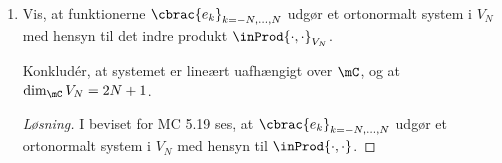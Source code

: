 \begin{opg}[Vektorrumstruktur]
\begin{enumerate}
    \iffalse\begin{proof}[Løsning]\hfill
    \begin{enumerate}[label=\roman*)]
        \item Lad $\alpha,\beta\in\mC$ og $f,g\in V_N$. Da haves
        \begin{align*}
            \inProd{\alpha f+\beta g,g_0}
                &= \frac{1}{2\pi}\int_{-\pi}^\pi
                    \pare{\alpha f\pare{x} + \beta g\pare{x}}
                    \overline{g_0\pare{x}} \, dx \\
                &= \alpha\frac{1}{2\pi}\int_{-\pi}^\pi
                    f\pare{x}\overline{g_0\pare{x}} \, dx
                    + \beta\frac{1}{2\pi}\int_{-\pi}^\pi
                    g\pare{x}\overline{g_0\pare{x}} \, dx \\
                &= \alpha\inProd{f,g_0} + \beta\inProd{g,g_0}
        \end{align*}
        
        \item Lad $f,g\in V_N$. Da haves
        $$ \inProd{f,g}
        = \frac{1}{2\pi}\int_{-\pi}^\pi f\pare{x}\overline{g\pare{x}} \, dx
        = \overline{\frac{1}{2\pi}\int_{-\pi}^\pi g\pare{x}
            \overline{f\pare{x}} \, dx}
        = \overline{\inProd{g,f}} $$
        
        \item Lad $f\in V_N$. Da haves
        $$ \inProd{f,f}
            = \frac{1}{2\pi}\int_{-\pi}^\pi f\pare{x}\overline{f\pare{x}} \, dx
            = \frac{1}{2\pi}\int_{-\pi}^\pi \abs{f\pare{x}}^2 \, dx
            \geq 0. $$
        Vi bemærker således, at $\inProd{f,f} = 0$, hvis og kun hvis $\frac{1}{2\pi}\int_{-\pi}^\pi \abs{f\pare{x}}^2 \, dx = 0$, og dette holder hvis og kun hvis $f\equiv 0$, eftersom alle trigonometriske polynomier er kontinuerte.
    \end{enumerate}
    \end{proof}\fi

    \item Vis, at funktionerne $\cbrac{e_k}_{k =-N, \ldots, N}$ udgør et ortonormalt system i $V_N$ med hensyn til det indre produkt $\inProd{\cdot,\cdot}_{V_N}$. 

    Konkludér, at systemet er lineært uafhængigt over $\mC$, og at $\dim_\mC V_N = 2N+1$. 
	
	\iffalse\begin{proof}[Løsning]
	I beviset for MC 5.19 ses, at $\cbrac{e_k}_{k=-N,\ldots,N}$ udgør et ortonormalt system i $V_N$ med hensyn til $\inProd{\cdot,\cdot}$. 
	

\end{proof}
\end{enumerate}
\end{opg}
